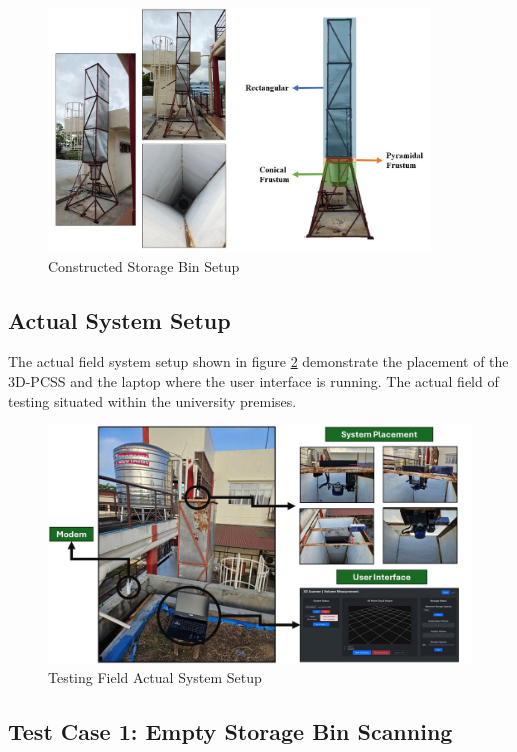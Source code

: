 \begin{figure}[H]
	\centering
	\includegraphics[width=0.9\textwidth]{Figures/constructed_storage_bin.jpg}
	\caption{Constructed Storage Bin Setup}
	\label{ch4:fig:constructed-storage-bin}
\end{figure}

\subsection{Actual System Setup}
The actual field system setup shown in figure \ref{ch4:fig:actual-system-setup} demonstrate the placement of the 3D-PCSS and the laptop where the user interface is running. The actual field of testing situated within the university premises.

\begin{figure}[H]
	\centering
	\includegraphics[width=1\textwidth]{Figures/actual-system-setup}
	\caption{Testing Field Actual System Setup}
	\label{ch4:fig:actual-system-setup}
\end{figure}


\subsection{Test Case 1: Empty Storage Bin Scanning}

